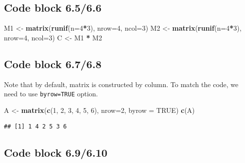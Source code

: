 \documentclass[
]{book}
\newenvironment{Shaded}{\begin{snugshade}}{\end{snugshade}}
\newcommand{\DataTypeTok}[1]{\textcolor[rgb]{0.13,0.29,0.53}{#1}}
\newcommand{\DecValTok}[1]{\textcolor[rgb]{0.00,0.00,0.81}{#1}}
\newcommand{\KeywordTok}[1]{\textcolor[rgb]{0.13,0.29,0.53}{\textbf{#1}}}
\newcommand{\NormalTok}[1]{#1}
\newcommand{\OperatorTok}[1]{\textcolor[rgb]{0.81,0.36,0.00}{\textbf{#1}}}
\newcommand{\OtherTok}[1]{\textcolor[rgb]{0.56,0.35,0.01}{#1}}
\newcommand{\StringTok}[1]{\textcolor[rgb]{0.31,0.60,0.02}{#1}}
\begin{document}
\hypertarget{code-block-6.56.6}{%
\subsection*{Code block 6.5/6.6}\label{code-block-6.56.6}}

\begin{Shaded}
\begin{Highlighting}[]
\NormalTok{M1 \textless{}{-}}\StringTok{ }\KeywordTok{matrix}\NormalTok{(}\KeywordTok{runif}\NormalTok{(}\DataTypeTok{n=}\DecValTok{4}\OperatorTok{*}\DecValTok{3}\NormalTok{), }\DataTypeTok{nrow=}\DecValTok{4}\NormalTok{, }\DataTypeTok{ncol=}\DecValTok{3}\NormalTok{)}
\NormalTok{M2 \textless{}{-}}\StringTok{ }\KeywordTok{matrix}\NormalTok{(}\KeywordTok{runif}\NormalTok{(}\DataTypeTok{n=}\DecValTok{4}\OperatorTok{*}\DecValTok{3}\NormalTok{), }\DataTypeTok{nrow=}\DecValTok{4}\NormalTok{, }\DataTypeTok{ncol=}\DecValTok{3}\NormalTok{)}
\NormalTok{C \textless{}{-}}\StringTok{ }\NormalTok{M1 }\OperatorTok{*}\StringTok{ }\NormalTok{M2}
\end{Highlighting}
\end{Shaded}

\hypertarget{code-block-6.76.8}{%
\subsection*{Code block 6.7/6.8}\label{code-block-6.76.8}}

Note that by default, matrix is constructed by column. To match the code, we need to use \texttt{byrow=TRUE} option.

\begin{Shaded}
\begin{Highlighting}[]
\NormalTok{A \textless{}{-}}\StringTok{ }\KeywordTok{matrix}\NormalTok{(}\KeywordTok{c}\NormalTok{(}\DecValTok{1}\NormalTok{, }\DecValTok{2}\NormalTok{, }\DecValTok{3}\NormalTok{, }\DecValTok{4}\NormalTok{, }\DecValTok{5}\NormalTok{, }\DecValTok{6}\NormalTok{), }\DataTypeTok{nrow=}\DecValTok{2}\NormalTok{, }\DataTypeTok{byrow =} \OtherTok{TRUE}\NormalTok{)}
\KeywordTok{c}\NormalTok{(A)}
\end{Highlighting}
\end{Shaded}

\begin{verbatim}
## [1] 1 4 2 5 3 6
\end{verbatim}

\hypertarget{code-block-6.96.10}{%
\subsection*{Code block 6.9/6.10}\label{code-block-6.96.10}}
\end{document}
